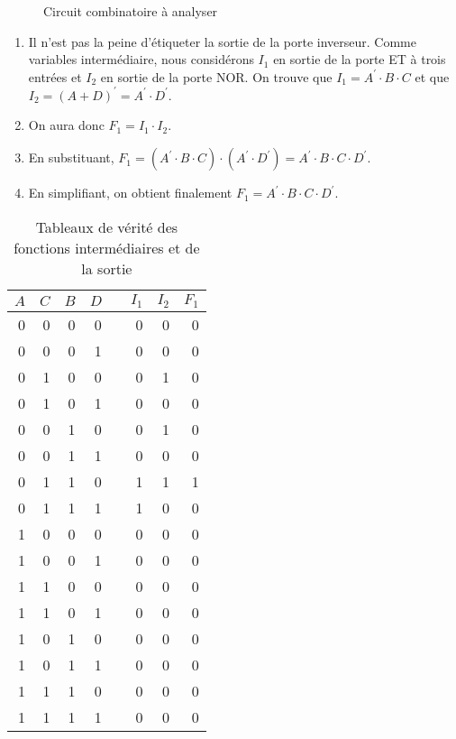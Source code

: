 \documentclass[11pt]{article}
\begin{document}
\begin{figure}[htbp]
\centering

\caption{\label{fig:org1eac572}Circuit combinatoire à analyser}
\end{figure}

\begin{enumerate}
\item Il n'est pas la peine d'étiqueter la sortie de la porte
inverseur. Comme variables intermédiaire, nous considérons \(I_1\)
en sortie de la porte ET à trois entrées et \(I_2\) en sortie de la
porte NOR. On trouve que \(I_1 = A^\prime \cdot B \cdot C\) et que
\(I_2 = (A + D)^\prime = A^\prime \cdot D^\prime\).

\item On aura donc \(F_1 = I_1 \cdot I_2\).

\item En substituant, \(F_1 = ( A^\prime \cdot B \cdot C ) \cdot (
   A^\prime \cdot D^\prime) = A^\prime \cdot B \cdot C \cdot
   D^\prime\).

\item En simplifiant, on obtient finalement \(F_1 = A^\prime \cdot B
   \cdot C \cdot D^\prime\).
\end{enumerate}

\begin{table}[htbp]
\caption{\label{tab:org1402816}Tableaux de vérité des fonctions intermédiaires et de la sortie}
\centering
\begin{tabular}{rrrrlrrr}
\(A\) & \(C\) & \(B\) & \(D\) &  & \(I_1\) & \(I_2\) & \(F_1\)\\
\hline
0 & 0 & 0 & 0 &  & 0 & 0 & 0\\
0 & 0 & 0 & 1 &  & 0 & 0 & 0\\
0 & 1 & 0 & 0 &  & 0 & 1 & 0\\
0 & 1 & 0 & 1 &  & 0 & 0 & 0\\
0 & 0 & 1 & 0 &  & 0 & 1 & 0\\
0 & 0 & 1 & 1 &  & 0 & 0 & 0\\
0 & 1 & 1 & 0 &  & 1 & 1 & 1\\
0 & 1 & 1 & 1 &  & 1 & 0 & 0\\
1 & 0 & 0 & 0 &  & 0 & 0 & 0\\
1 & 0 & 0 & 1 &  & 0 & 0 & 0\\
1 & 1 & 0 & 0 &  & 0 & 0 & 0\\
1 & 1 & 0 & 1 &  & 0 & 0 & 0\\
1 & 0 & 1 & 0 &  & 0 & 0 & 0\\
1 & 0 & 1 & 1 &  & 0 & 0 & 0\\
1 & 1 & 1 & 0 &  & 0 & 0 & 0\\
1 & 1 & 1 & 1 &  & 0 & 0 & 0\\
\end{tabular}
\end{table}
\end{document}
